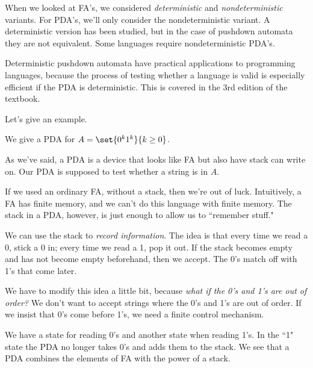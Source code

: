 
When we looked at FA's, we considered {\it deterministic} and {\it nondeterministic} variants. For PDA's, we'll only consider the nondeterministic variant. A deterministic version has been studied, but in the case of pushdown automata they are not equivalent. Some languages require nondeterministic PDA's.

Deterministic pushdown automata have practical applications to programming languages, because the process of testing whether a language is valid is especially efficient if the PDA is deterministic. This is covered in the 3rd edition of the textbook.

Let's give an example.
\begin{ex}
We give a PDA for $A=\set{0^k1^k}{k\ge 0}$.

As we've said, a PDA is a device that looks like FA but also have stack can write on. Our PDA is supposed to test whether a string is in $A$.

If we used an ordinary FA, without a stack, then we're out of luck. Intuitively, a FA has finite memory, and we can't do this language with finite memory. The stack in a PDA, however, is just enough to allow us to ``remember stuff."\\

\vskip0.15in

We can use the stack to {\it record information}. %
The idea is that every time we read a 0, stick a 0 in; every time we read a 1, pop it out. If the stack becomes empty and has not become empty beforehand, then we accept. The 0's match off with 1's that come later.

We have to modify this idea a little bit, because {\it what if the 0's and 1's are out of order?} We don't want to accept strings where the 0's and 1's are out of order. 
If we insist that 0's come before 1's, we need a finite control mechanism.

We have a state for reading 0's and another state when reading 1's. In the ``1" state the PDA no longer takes 0's and adds them to the stack. We see that a PDA combines the elements of FA with the power of a stack.



\end{ex}
